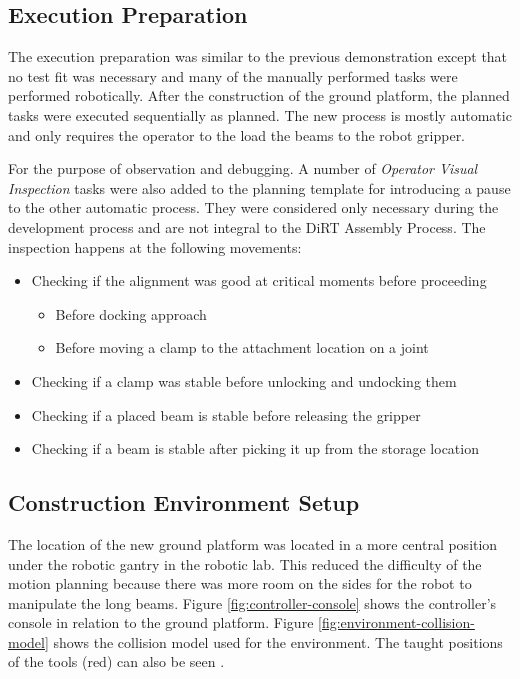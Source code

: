 \subsection{Execution Preparation}
\label{subsection:exploration-3-execution-plan}

The execution preparation was similar to the previous demonstration except that no test fit was necessary and many of the manually performed tasks were performed robotically. After the construction of the ground platform, the planned tasks were executed sequentially as planned. The new process is mostly automatic and only requires the operator to the load the beams to the robot gripper.

For the purpose of observation and debugging. A number of \textit{Operator Visual Inspection} tasks were also added to the planning template for introducing a pause to the other automatic process. They were considered only necessary during the development process and are not integral to the DiRT Assembly Process. The inspection happens at the following movements:

\begin{itemize}
	\item Checking if the alignment was good at critical moments before proceeding
    \begin{itemize}
        \item Before docking approach
        \item Before moving a clamp to the attachment location on a joint
    \end{itemize}

	\item Checking if a clamp was stable before unlocking and undocking them
	\item Checking if a placed beam is stable before releasing the gripper
	\item Checking if a beam is stable after picking it up from the storage location
\end{itemize}

\subsection{Construction Environment Setup}
\label{subsection:exploration-3-construction-environment-setup}

The location of the new ground platform  was located in a more central position under the robotic gantry in the robotic lab. This reduced the difficulty of the motion planning because there was more room on the sides for the robot to manipulate the long beams. Figure \ref{fig:controller-console} shows the controller’s console in relation to the ground platform.
Figure \ref{fig:environment-collision-model} shows the collision model used for the environment. The taught positions of the tools (red) can also be seen .

